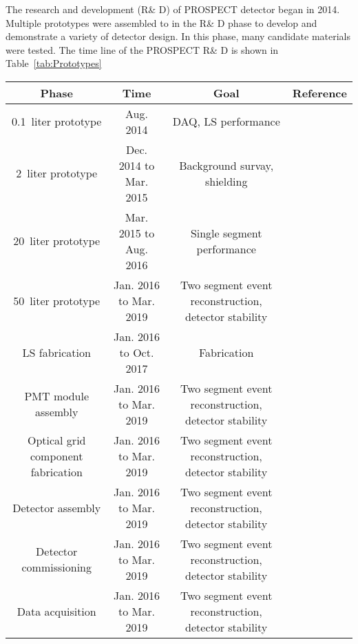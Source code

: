 \label{Ch4}

The research and development (R\& D) of PROSPECT detector began in 2014.
Multiple prototypes were assembled to in the R\& D phase to develop and demonstrate a variety of detector design.
In this phase, many candidate materials were tested. 
The time line of the PROSPECT R\& D is shown in Table~\ref{tab:Prototypes}

\begin{sidewaystable}[h!]
    \centering
    \caption[PROSPECT R\& D and construction phases]{PROSPECT R\& D and construction phases.}
    \begin{tabular}{cccc}
        Phase & Time & Goal & Reference \\
        \hline
        \hline
        0.1~liter prototype  & Aug. 2014 & DAQ, LS performance &\\
        2~liter prototype   & Dec. 2014 to Mar. 2015 & Background survay, shielding & \cite{bib:prospect_background}\\
        20~liter prototype   & Mar. 2015 to Aug. 2016 & Single segment performance & \cite{bib:P20} \\
        50~liter prototype   & Jan. 2016 to Mar. 2019 & Two segment event reconstruction, detector stability & \cite{bib:P50} \\
        \hline
        LS fabrication & Jan. 2016 to Oct. 2017 & Fabrication  & \cite{bib:P50} \\
        PMT module assembly & Jan. 2016 to Mar. 2019 & Two segment event reconstruction, detector stability & \cite{bib:P50} \\
        Optical grid component fabrication & Jan. 2016 to Mar. 2019 & Two segment event reconstruction, detector stability & \cite{bib:P50} \\  
        \hline
		Detector assembly & Jan. 2016 to Mar. 2019 & Two segment event reconstruction, detector stability & \cite{bib:P50} \\       
        Detector commissioning & Jan. 2016 to Mar. 2019 & Two segment event reconstruction, detector stability & \cite{bib:P50} \\ 
        \hline 
        Data acquisition & Jan. 2016 to Mar. 2019 & Two segment event reconstruction, detector stability & \cite{bib:P50} \\ 
        \hline
    \end{tabular}
        \label{tab:Prototypes}
\end{sidewaystable}

	
\label{sec:OG}



